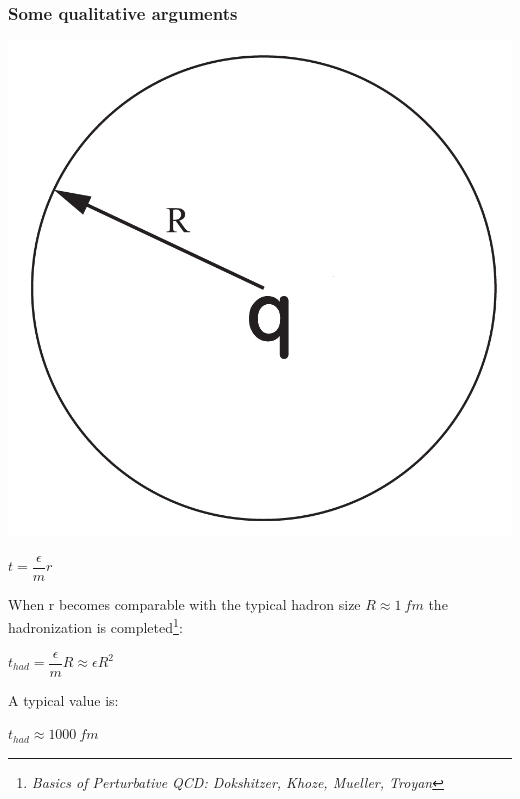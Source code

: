 \documentclass[9pt, xcolor=dvipsnames]{beamer}
\begin{document}
\begin{frame}
\frametitle{Some qualitative arguments}
\begin{center}
\includegraphics[scale=0.1]{color}
\end{center}

\begin{center}
$t=\dfrac{\epsilon}{m}r$
\end{center}

\pause
When r becomes comparable with the typical hadron size $R\approx 1 ~fm$ the hadronization is completed\footnote{\itshape{Basics of Perturbative QCD}:
Dokshitzer, Khoze, Mueller, Troyan}:
\begin{block}{}
\begin{center}
$t_{had}=\dfrac{\epsilon}{m}R\approx\epsilon R^{2}$
\end{center}
\end{block}
\pause
A typical value is:
\begin{block}{}
\begin{center}
 $t_{had}\approx 1000 ~fm$
\end{center}
\end{block}
\end{frame}
\end{document}

